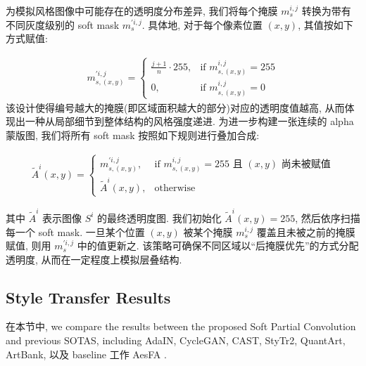 为模拟风格图像中可能存在的透明度分布差异, 我们将每个掩膜 $m_s^{i,j}$ 转换为带有不同灰度级别的 soft mask $m_s^{'i,j}$. 具体地, 对于每个像素位置 $(x, y)$, 其值按如下方式赋值:

\begin{equation}
    \begin{aligned}
        \label{eq:soft-mask}
        m_{s,(x,y)}^{'i,j} = 
        \begin{cases} 
            \frac{j+1}{n} \cdot 255, & \text{if } m_{s,(x,y)}^{i,j} = 255 \\
            0, & \text{if } m_{s,(x,y)}^{i,j} = 0
        \end{cases} 
    \end{aligned}
\end{equation}
该设计使得编号越大的掩膜(即区域面积越大的部分)对应的透明度值越高, 从而体现出一种从局部细节到整体结构的风格强度递进.
为进一步构建一张连续的 alpha 蒙版图, 我们将所有 soft mask 按照如下规则进行叠加合成:

\begin{equation}
    \begin{aligned}
        \label{eq:alpha-composition}
        \tilde{A}^i(x, y) = 
        \begin{cases} m_{s,(x,y)}^{'i,j}, & \text{if } m_{s,(x,y)}^{i,j} = 255 \text{ 且 } (x, y) \text{ 尚未被赋值} \\
        \tilde{A}^i(x, y), & \text{otherwise} \end{cases}
    \end{aligned}
\end{equation}

其中 $\tilde{A}^i$ 表示图像 $S^i$ 的最终透明度图. 我们初始化 $\tilde{A}^i(x, y) = 255$, 然后依序扫描每一个 soft mask. 一旦某个位置 $(x, y)$ 被某个掩膜 $m_s^{i,j}$ 覆盖且未被之前的掩膜赋值, 则用 $m_s^{'i,j}$ 中的值更新之. 该策略可确保不同区域以“后掩膜优先”的方式分配透明度, 从而在一定程度上模拟层叠结构.


\subsection{Style Transfer Results}

在本节中, we compare the results between the proposed Soft Partial Convolution and previous SOTAS, including AdaIN\cite{huang2017arbitrary}, CycleGAN\cite{zhu2017unpaired}, CAST\cite{zhang2022domain}, StyTr2\cite{deng2022stytr2},  QuantArt\cite{huang2023quantart}, ArtBank\cite{zhang2024artbank}, 以及 baseline 工作 AesFA \cite{kwon2024aesfa}. 

